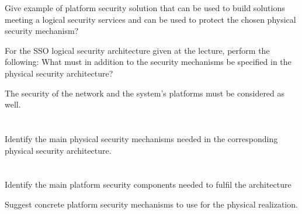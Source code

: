 \begin{questions}
\item Give example of platform security solution that can be used to build solutions meeting a logical security services and can be used to protect the chosen physical security mechanism?
\item For the SSO logical security architecture given at the lecture, perform the following:
\question{} What must in addition to the security mechanisms be specified in the physical security architecture?
  \begin{solution}
    The security of the network and the system's platforms must be considered as well.
  \end{solution}

  \begin{parts}
  \part{} Identify the main physical security mechanisms needed in the corresponding physical security architecture.
  \part{} Identify the main platform security components needed to fulfil the architecture
    \begin{subparts}
    \subpart{} Suggest concrete platform security mechanisms to use for the physical realization.
    \end{subparts}
  \end{parts}
\end{questions}


